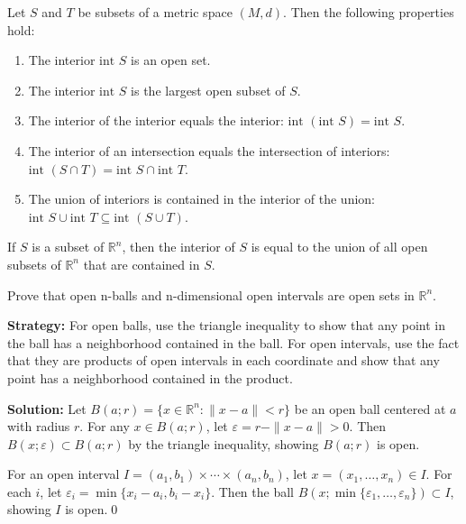 \begin{theorem}
Let $S$ and $T$ be subsets of a metric space $(M,d)$. Then the following properties hold:
\begin{enumerate}
\item The interior $\text{int } S$ is an open set.
\item The interior $\text{int } S$ is the largest open subset of $S$.
\item The interior of the interior equals the interior: $\text{int }(\text{int } S) = \text{int } S$.
\item The interior of an intersection equals the intersection of interiors: $\text{int }(S \cap T) = \text{int } S \cap \text{int } T$.
\item The union of interiors is contained in the interior of the union: $\text{int } S \cup \text{int } T \subseteq \text{int }(S \cup T)$.
\end{enumerate}
\end{theorem}

\begin{theorem}
If $S$ is a subset of $\mathbb{R}^n$, then the interior of $S$ is equal to the union of all open subsets of $\mathbb{R}^n$ that are contained in $S$.
\end{theorem}



\begin{problembox}
Prove that open n-balls and n-dimensional open intervals are open sets in $\mathbb{R}^n$.
\end{problembox}

\noindent\textbf{Strategy:} For open balls, use the triangle inequality to show that any point in the ball has a neighborhood contained in the ball. For open intervals, use the fact that they are products of open intervals in each coordinate and show that any point has a neighborhood contained in the product.

\bigskip\noindent\textbf{Solution:} Let $B(a;r) = \{x \in \mathbb{R}^n : \|x-a\| < r\}$ be an open ball centered at $a$ with radius $r$. For any $x \in B(a;r)$, let $\varepsilon = r - \|x-a\| > 0$. Then $B(x;\varepsilon) \subset B(a;r)$ by the triangle inequality, showing $B(a;r)$ is open.

For an open interval $I = (a_1,b_1) \times \cdots \times (a_n,b_n)$, let $x = (x_1,\ldots,x_n) \in I$. For each $i$, let $\varepsilon_i = \min\{x_i - a_i, b_i - x_i\}$. Then the ball $B(x;\min\{\varepsilon_1,\ldots,\varepsilon_n\}) \subset I$, showing $I$ is open.\qed


